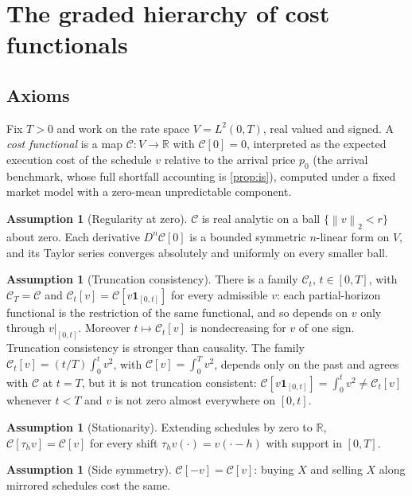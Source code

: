 \documentclass[11pt]{article}
\newcommand{\norm}[1]{\left\lVert #1\right\rVert}
\numberwithin{equation}{section}
\theoremstyle{definition}
\theoremstyle{remark}
\newcommand{\R}{\mathbb{R}}
\theoremstyle{definition}
\newtheorem{assumption}[theorem]{Assumption}
\begin{document}
\section{The graded hierarchy of cost functionals}\label{sec:hierarchy}

\subsection{Axioms}
Fix $T>0$ and work on the rate space $V=L^2(0,T)$, real valued and signed. A
\emph{cost functional} is a map $\mathcal C:V\to\R$ with $\mathcal C[0]=0$,
interpreted as the expected execution cost of the schedule $v$ relative to the
arrival price $p_0$ (the arrival benchmark, whose full shortfall accounting is
\cref{prop:is}), computed under a fixed market model with a
zero-mean unpredictable component.

\begin{assumption}[Regularity at zero]\label{ax:analytic}
$\mathcal C$ is real analytic on a ball $\{\norm v_2<r\}$ about zero.
Each derivative $D^n\mathcal C[0]$ is a bounded symmetric $n$-linear form on
$V$, and its Taylor series converges absolutely and uniformly on every
smaller ball.
\end{assumption}

\begin{assumption}[Truncation consistency]\label{ass:trunc}
There is a family $\mathcal C_t$, $t\in[0,T]$, with $\mathcal C_T=\mathcal C$ and
$\mathcal C_t[v]=\mathcal C[v\mathbf 1_{[0,t]}]$ for every admissible $v$: each partial-horizon
functional is the restriction of the same functional, and so depends on $v$
only through $v|_{[0,t]}$. Moreover $t\mapsto \mathcal C_t[v]$ is nondecreasing for $v$
of one sign. Truncation consistency is stronger than causality. The family
$\mathcal C_t[v]=(t/T)\int_0^t v^2$, with $\mathcal C[v]=\int_0^T v^2$, depends only on the past
and agrees with $\mathcal C$ at $t=T$, but it is not truncation consistent:
$\mathcal C[v\mathbf 1_{[0,t]}]=\int_0^t v^2\ne \mathcal C_t[v]$ whenever $t<T$ and $v$ is not
zero almost everywhere on $[0,t]$.
\end{assumption}


\begin{assumption}[Stationarity]\label{ax:stat}
Extending schedules by zero to $\R$, $\mathcal C[\tau_h v]=\mathcal C[v]$ for
every shift $\tau_hv(\cdot)=v(\cdot-h)$ with support in $[0,T]$.
\end{assumption}

\begin{assumption}[Side symmetry]\label{ax:symm}
$\mathcal C[-v]=\mathcal C[v]$: buying $X$ and selling $X$ along mirrored
schedules cost the same.
\end{assumption}
\end{document}

